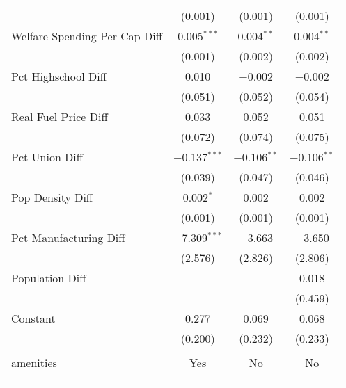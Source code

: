 \begin{table}[!htbp]
\begin{tabular}{@{\extracolsep{5pt}}lccc}
  & (0.001) & (0.001) & (0.001) \\ 
  Welfare Spending Per Cap Diff & 0.005$^{***}$ & 0.004$^{**}$ & 0.004$^{**}$ \\ 
  & (0.001) & (0.002) & (0.002) \\ 
  Pct Highschool Diff & 0.010 & $-$0.002 & $-$0.002 \\ 
  & (0.051) & (0.052) & (0.054) \\ 
  Real Fuel Price Diff & 0.033 & 0.052 & 0.051 \\ 
  & (0.072) & (0.074) & (0.075) \\ 
  Pct Union Diff & $-$0.137$^{***}$ & $-$0.106$^{**}$ & $-$0.106$^{**}$ \\ 
  & (0.039) & (0.047) & (0.046) \\ 
  Pop Density Diff & 0.002$^{*}$ & 0.002 & 0.002 \\ 
  & (0.001) & (0.001) & (0.001) \\ 
  Pct Manufacturing Diff & $-$7.309$^{***}$ & $-$3.663 & $-$3.650 \\ 
  & (2.576) & (2.826) & (2.806) \\ 
  Population Diff &  &  & 0.018 \\ 
  &  &  & (0.459) \\ 
  Constant & 0.277 & 0.069 & 0.068 \\ 
  & (0.200) & (0.232) & (0.233) \\ 
 \hline \\[-1.8ex] 
amenities & Yes & No & No \\ 
\hline \\[-1.8ex] 
\hline 
\hline \\[-1.8ex] 
\end{tabular} 
\end{table} 
